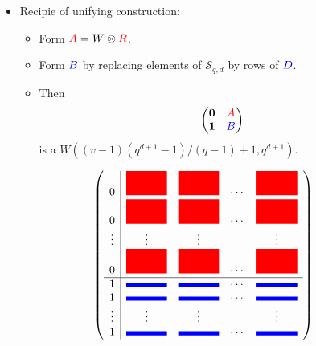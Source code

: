 \documentclass{beamer}
\newcommand{\rred}[1]{\textcolor{red}{#1}}
\newcommand{\bblue}[1]{\textcolor{blue}{#1}}
\begin{document}
\begin{frame}

  \begin{itemize}
  \item Recipie of unifying construction:
    \begin{itemize}
    \item Form $\rred{A} = W \otimes \rred{R}$.
    \item Form $\bblue{B}$ by replacing elements of $\mathcal{S}_{q,d}$ by rows of $\bblue{D}$.
    \item Then
      \[
        \begin{pmatrix}
          \textbf{0} & \rred{A} \\
          \textbf{1} & \bblue{B}
        \end{pmatrix}
      \]
      is a $W((v-1)(q^{d+1}-1)/(q-1)+1,q^{d+1})$.
    \end{itemize}
  \end{itemize}
  
\end{frame}

{
\newcommand{\rbox}{\rred{\mbox{\rule{0.5in}{0.3in}}}}
\newcommand{\bbox}{\bblue{\mbox{\rule{0.5in}{0.05in}}}}

\begin{frame}

  \[
    \left(
      \begin{array}{c|cccc}
        0 & \rbox & \rbox & \cdots & \rbox \\
        0 & \rbox & \rbox & \cdots & \rbox \\
        \vdots & \vdots & \vdots &  & \vdots \\
        0 & \rbox & \rbox & \cdots & \rbox \\ \hline
        1 & \bbox & \bbox & \cdots & \bbox \\
        1 & \bbox & \bbox & \cdots & \bbox \\
        \vdots & \vdots & \vdots &  & \vdots \\
        1 & \bbox & \bbox & \cdots & \bbox \\
      \end{array}
    \right)
  \]
  
\end{frame}
}
\end{document}
